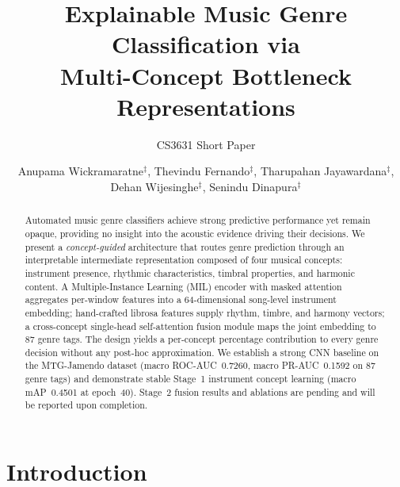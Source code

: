 \documentclass[sigconf,nonacm]{acmart}
\begin{document}
\title{Explainable Music Genre Classification via\\Multi-Concept Bottleneck Representations}
\subtitle{CS3631 Short Paper}

\author{%
Anupama Wickramaratne$^{\ddagger}$,
Thevindu Fernando$^{\ddagger}$,
Tharupahan Jayawardana$^{\ddagger}$,
Dehan Wijesinghe$^{\ddagger}$,
Senindu Dinapura$^{\ddagger}$}

\begin{abstract}
Automated music genre classifiers achieve strong predictive performance yet remain opaque,
providing no insight into the acoustic evidence driving their decisions. We present a
\emph{concept-guided} architecture that routes genre prediction through an interpretable
intermediate representation composed of four musical concepts: instrument presence, rhythmic
characteristics, timbral properties, and harmonic content. A Multiple-Instance Learning (MIL)
encoder with masked attention aggregates per-window features into a 64-dimensional song-level
instrument embedding; hand-crafted librosa features supply rhythm, timbre, and harmony vectors;
a cross-concept single-head self-attention fusion module maps the joint embedding to 87 genre tags.
The design yields a per-concept percentage contribution to every genre decision without any
post-hoc approximation. We establish a strong CNN baseline on the MTG-Jamendo dataset
(macro ROC-AUC~0.7260, macro PR-AUC~0.1592 on 87 genre tags) and demonstrate stable Stage~1
instrument concept learning (macro mAP~0.4501 at epoch~40). Stage~2 fusion results and
ablations are pending and will be reported upon completion.
\end{abstract}


\maketitle

\section{Introduction}
\end{document}
